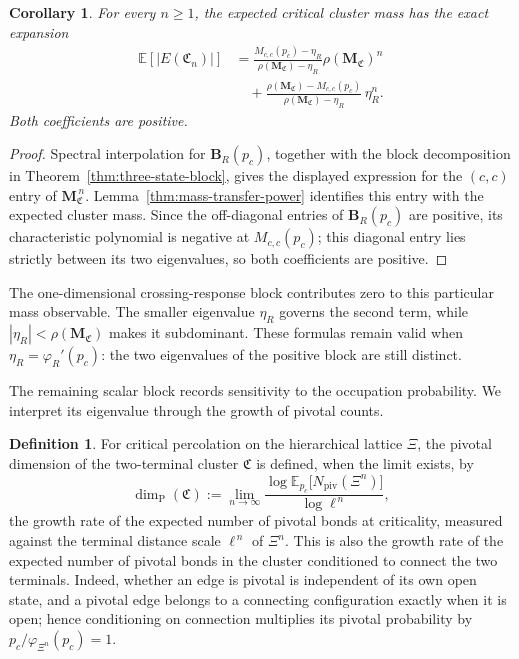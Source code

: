 \documentclass[scheme=plain,11pt]{ctexart}
\newtheorem{corollary}[theorem]{Corollary}
\theoremstyle{definition}
\newtheorem{definition}[theorem]{Definition}
\theoremstyle{remark}
\begin{document}
\begin{corollary}\label{cor:SP-closed-form}\label{cor:mass-spectral-expansion}
For every $n\ge1$, the expected critical cluster mass has the exact expansion
\begin{align*}
 \mathbb E[|E(\mathfrak C_n)|]
 &=\frac{M_{c,c}(p_c)-\eta_R}{\rho(\mathbf M_{\mathfrak C})-\eta_R}
       \rho(\mathbf M_{\mathfrak C})^n\\
 &\quad+\frac{\rho(\mathbf M_{\mathfrak C})-M_{c,c}(p_c)}
       {\rho(\mathbf M_{\mathfrak C})-\eta_R}\,\eta_R^n.
\end{align*}
Both coefficients are positive.
\end{corollary}
\begin{proof}
Spectral interpolation for $\mathbf B_R(p_c)$, together with the block decomposition in Theorem~\ref{thm:three-state-block}, gives the displayed expression for the $(c,c)$ entry of $\mathbf M_{\mathfrak C}^{\,n}$.
Lemma~\ref{thm:mass-transfer-power} identifies this entry with the expected cluster mass.
Since the off-diagonal entries of $\mathbf B_R(p_c)$ are positive, its characteristic polynomial is negative at $M_{c,c}(p_c)$; this diagonal entry lies strictly between its two eigenvalues, so both coefficients are positive.
\end{proof}

The one-dimensional crossing-response block contributes zero to this particular mass observable.
The smaller eigenvalue $\eta_R$ governs the second term, while $|\eta_R|<\rho(\mathbf M_{\mathfrak C})$ makes it subdominant.
These formulas remain valid when $\eta_R=\varphi_R'(p_c)$: the two eigenvalues of the positive block are still distinct.

The remaining scalar block records sensitivity to the occupation probability.
We interpret its eigenvalue through the growth of pivotal counts.

\begin{definition}\label{def:pivotal-dimension}
For critical percolation on the hierarchical lattice $\Xi$, the pivotal dimension of the two-terminal cluster $\mathfrak C$ is defined, when the limit exists, by
\[
   \dim_{\mathrm P}(\mathfrak C)
   :=
   \displaystyle\lim_{n\to\infty}\frac{\log \mathbb E_{p_c}\bigl[N_{\mathrm{piv}}(\Xi^{n})\bigr]}{\log \ell^{\,n}},
\]
the growth rate of the expected number of pivotal bonds at criticality, measured against the terminal distance scale $\ell^{\,n}$ of $\Xi^{n}$.
This is also the growth rate of the expected number of pivotal bonds in the cluster conditioned to connect the two terminals.
Indeed, whether an edge is pivotal is independent of its own open state, and a pivotal edge belongs to a connecting configuration exactly when it is open; hence conditioning on connection multiplies its pivotal probability by $p_c/\varphi_{\Xi^n}(p_c)=1$.
\end{definition}
\end{document}
